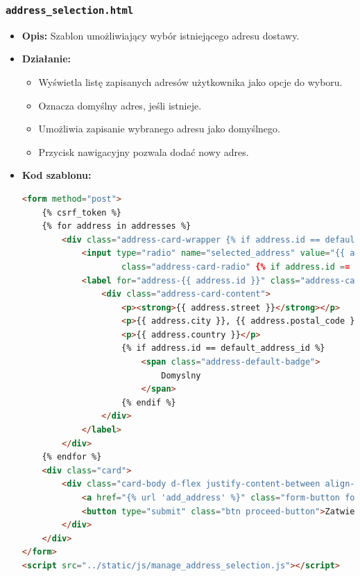 \documentclass[12pt,a4paper,oneside]{article}
\theoremstyle{definition}
\numberwithin{equation}{section}
\begin{document}
\subsubsection*{\texttt{address\_selection.html}}
\label{sec:address_selection_template}
\begin{itemize}
    \item \textbf{Opis:} Szablon umożliwiający wybór istniejącego adresu dostawy.
    \item \textbf{Działanie:}
        \begin{itemize}
            \item Wyświetla listę zapisanych adresów użytkownika jako opcje do wyboru.
            \item Oznacza domyślny adres, jeśli istnieje.
            \item Umożliwia zapisanie wybranego adresu jako domyślnego.
            \item Przycisk nawigacyjny pozwala dodać nowy adres.
        \end{itemize}
    \item \textbf{Kod szablonu:}
\begin{lstlisting}[language=HTML, caption=Szablon address\_selection.html]
<form method="post">
    {% csrf_token %}
    {% for address in addresses %}
        <div class="address-card-wrapper {% if address.id == default_address_id %}address-default{% endif %}">
            <input type="radio" name="selected_address" value="{{ address.id }}" id="address-{{ address.id }}"
                    class="address-card-radio" {% if address.id == default_address_id %}checked{% endif %}>
            <label for="address-{{ address.id }}" class="address-card-label">
                <div class="address-card-content">
                    <p><strong>{{ address.street }}</strong></p>
                    <p>{{ address.city }}, {{ address.postal_code }}</p>
                    <p>{{ address.country }}</p>
                    {% if address.id == default_address_id %}
                        <span class="address-default-badge">
                            Domyslny
                        </span>
                    {% endif %}
                </div>
            </label>
        </div>
    {% endfor %}
    <div class="card">
        <div class="card-body d-flex justify-content-between align-items-center">
            <a href="{% url 'add_address' %}" class="form-button form-button-secondary">Dodaj nowy adres</a>
            <button type="submit" class="btn proceed-button">Zatwierdz adres</button>
        </div>
    </div>
</form>
<script src="../static/js/manage_address_selection.js"></script>
\end{lstlisting}
\end{itemize}
\end{document}
